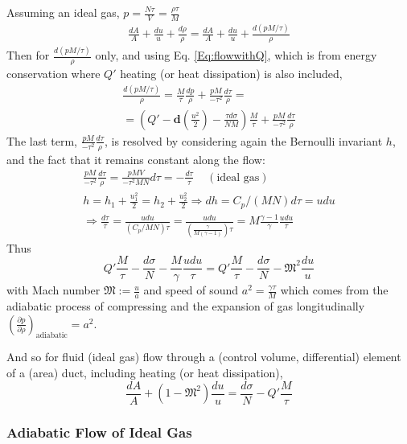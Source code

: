 \documentclass[10pt]{amsart}
\begin{document}
\begin{multicols*}{2}
Assuming an ideal gas, $p=\frac{N\tau}{V} = \frac{\rho \tau}{M}$
\[
\begin{gathered}
  \frac{dA}{A} + \frac{du}{u} + \frac{d\rho}{\rho} = \frac{dA}{A} + \frac{du}{u} + \frac{d (pM/\tau) }{\rho}
\end{gathered}
\]
Then for $\frac{d (pM/\tau) }{\rho}$ only, and using Eq. \ref{Eq:flowwithQ}, which is from energy conservation where $Q'$ heating (or heat dissipation) is also included,
\[
\begin{gathered}
 \frac{d (pM/\tau) }{\rho} = \frac{M}{\tau} \frac{dp}{\rho} + \frac{pM}{-\tau^2} \frac{d\tau}{\rho} = \\
 = \left( Q' - \mathbf{d} \left( \frac{u^2}{2} \right) - \frac{\tau d\sigma}{NM} \right) \frac{M}{\tau} + \frac{pM}{-\tau^2} \frac{d\tau}{\rho} 
\end{gathered}
\]
The last term, $\frac{pM}{-\tau^2} \frac{d\tau}{\rho}$, is resolved by considering again the Bernoulli invariant $h$, and the fact that it remains constant along the flow:
\[
\begin{gathered}
  \frac{pM}{-\tau^2} \frac{d\tau}{\rho} = \frac{ pMV}{-\tau^2 MN} d\tau = -\frac{ d\tau }{\tau} \quad \, (\text{ideal gas}) \\
h = h_1 + \frac{u_1^2}{2} =  h_2 + \frac{u_2^2}{2}  \Longrightarrow dh = C_p/(MN) d\tau = udu \\
\Longrightarrow \frac{d\tau}{\tau} = \frac{udu}{(C_p/MN) \tau} = \frac{ udu }{ \left( \frac{\gamma  }{ M(\gamma -1) } \right)\tau } = M\frac{\gamma -1}{ \gamma} \frac{udu}{ \tau } 
\end{gathered}
\]
Thus
\[
Q' \frac{M}{\tau} - \frac{d\sigma}{N} - \frac{M}{\gamma} \frac{udu}{\tau} = Q' \frac{M}{\tau} - \frac{d\sigma}{N} - \mathfrak{M}^2 \frac{du}{u}
\]
with Mach number $\mathfrak{M} := \frac{u}{a}$ and speed of sound $a^2 = \frac{\gamma \tau}{M}$ which comes from the adiabatic process of compressing and the expansion of gas longitudinally $ \left( \frac{ \partial p }{ \partial \rho } \right)_{\text{adiabatic}} = a^2$.  

And so for fluid (ideal gas) flow through a (control volume, differential) element of a (area) duct, including heating (or heat dissipation), 
\begin{equation}\label{Eq:ductflowwithQ}
  \frac{dA}{A} + (1 - \mathfrak{M}^2) \frac{du}{u} = \frac{d\sigma}{N} - Q' \frac{M}{\tau}
\end{equation}

\subsubsection{Adiabatic Flow of Ideal Gas}


\end{multicols*}
\end{document}
